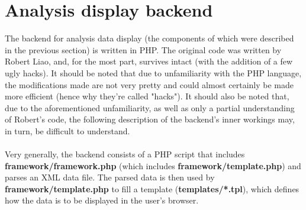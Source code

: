 \documentclass[11pt]{article}
\begin{document}
\section{Analysis display backend}
The backend for analysis data display (the components of which were described in the previous section) is written in PHP. The original code was written by Robert Liao, and, for the most part, survives intact (with the addition of a few ugly hacks). It should be noted that due to unfamiliarity with the PHP language, the modifications made are not very pretty and could almost certainly be made more efficient (hence why they're called "hacks"). It should also be noted that, due to the aforementioned unfamiliarity, as well as only a partial understanding of Robert's code, the following description of the backend's inner workings may, in turn, be difficult to understand.\\\\
Very generally, the backend consists of a PHP script that includes \textbf{framework/framework.php} (which includes \textbf{framework/template.php}) and parses an XML data file. The parsed data is then used by \textbf{framework/template.php} to fill a template (\textbf{templates/*.tpl}), which defines how the data is to be displayed in the user's browser.
\end{document}
